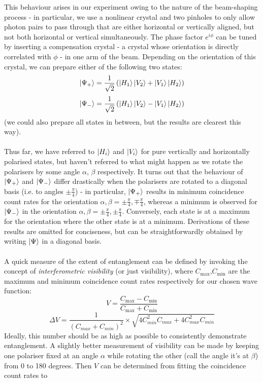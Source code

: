 \documentclass[10pt,a4paper]{article}
\begin{document}
\noindent This behaviour arises in our experiment owing to the nature of the beam-shaping process - in particular, we use a nonlinear crystal and two pinholes to only allow photon pairs to pass through that are either horizontal or vertically aligned, but not both horizontal or vertical simultaneously. The phase factor $e^{i\phi}$ can be tuned by inserting a compensation crystal - a crystal whose orientation is directly correlated with $\phi$ - in one arm of the beam. Depending on the orientation of this crystal, we can prepare either of the following two states:
$$\ket{\Psi_{+}} = \dfrac{1}{\sqrt{2}}\left(\ket{H_{1}}\ket{V_{2}}+ \ket{V_{1}}\ket{H_{2}}\right)$$
$$\ket{\Psi_{-}} = \dfrac{1}{\sqrt{2}}\left(\ket{H_{1}}\ket{V_{2}} - \ket{V_{1}}\ket{H_{2}}\right)$$
(we could also prepare all states in between, but the results are clearest this way).\\
\\
Thus far, we have referred to $\ket{H_{i}}$ and $\ket{V_{i}}$ for pure  vertically and horizontally polarised states, but haven't referred to what might happen as we rotate the polarisers by some angle $\alpha$, $\beta$ respectively. It turns out that the behaviour of $\ket{\Psi_{+}}$ and $\ket{\Psi_{-}}$ differ drastically when the polarisers are rotated to a diagonal basis (i.e. to angles $\pm\frac{\pi}{4}$) - in particular, $\ket{\Psi_{+}}$ results in minimum coincidence count rates for the orientation $\alpha, \beta = \pm \frac{\pi}{4}, \mp \frac{\pi}{4}$, whereas a minimum is observed for $\ket{\Psi_{-}}$ in the orientation $\alpha, \beta = \pm \frac{\pi}{4}, \pm \frac{\pi}{4}$. Conversely, each state is at a maximum for the orientation where the other state is at a minimum. Derivations of these results are omitted for conciseness, but can be straightforwardly obtained by writing $\ket{\Psi}$ in a diagonal basis.\\
\\
A quick measure of the extent of entanglement can be defined by invoking the concept of \textsl{interferometric visibility} (or just visibility), where $C_{\mathrm{max}}$,$C_{\mathrm{min}}$ are the maximum and minimum coincidence count rates respectively for our chosen wave function:
$$V = \dfrac{C_{\mathrm{max}} - C_{\mathrm{min}}}{C_{\mathrm{max}} + C_{\mathrm{min}}}$$
$$\Delta V = \dfrac{1}{\left(C_{max} + C_{min}\right)^{2}}\times \sqrt{4C_{min}^{2}C_{max} + 4C_{max}^{2}C_{min}}$$
Ideally, this number should be as high as possible to consistently demonstrate entanglement. A slightly better measurement of visibility can be made by keeping one polariser fixed at an angle $\alpha$ while rotating the other (call the angle it's at $\beta$) from 0 to 180 degrees. Then $V$ can be determined from fitting the coincidence count rates to
\end{document}
